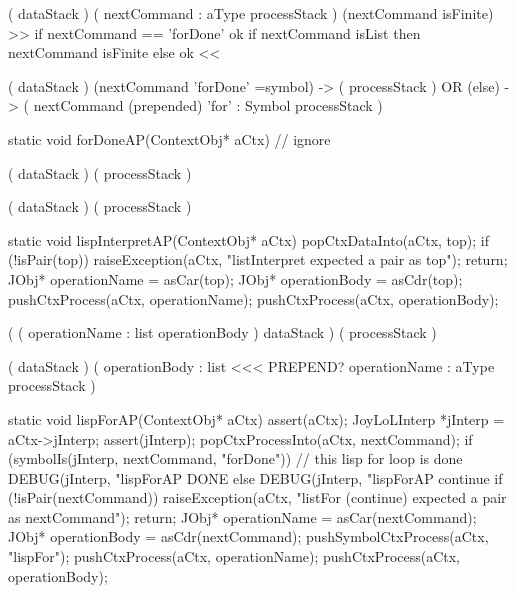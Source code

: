 \starttyping

\startWord[for]
\preDataStack
  (
    dataStack
  )
\preProcessStack
  (
    nextCommand : aType
    processStack
  )
\preConditions
  (nextCommand isFinite)  >> if nextCommand == 'forDone' ok
                             if nextCommand isList then nextCommand isFinite
                             else ok <<
\stopPreStack

\postDataStack
  (
    dataStack
  )
\postProcessStack
  (nextCommand 'forDone' =symbol) -> (
    processStack
  )
  OR
  (else) -> (
    nextCommand (prepended)
    'for' : Symbol
    processStack
  )
\postConditions
\stopPostStack

\stopWord

\stoptyping

\startCCode
static void forDoneAP(ContextObj* aCtx) {
  // ignore
}
\stopCCode

\starttyping

\startWord[forDone]

\preDataStack
  ( dataStack )
\preProcessStack
  ( processStack )
\preConditions
\stopPreStack

\postDataStack
  ( dataStack )
\postProcessStack
  ( processStack )
\postConditions
\stopPostStack

\stopWord

\stoptyping

\startCCode
static void lispInterpretAP(ContextObj* aCtx) {
  popCtxDataInto(aCtx, top);
  if (!isPair(top)) {
    raiseException(aCtx,
      "listInterpret expected a pair as top");
    return;
  }
  JObj* operationName = asCar(top);
  JObj* operationBody = asCdr(top);
  pushCtxProcess(aCtx, operationName);
  pushCtxProcess(aCtx, operationBody);
}
\stopCCode

\starttyping

\startWord[lispInterpret]

\preDataStack
  (
    (
      operationName : list
      operationBody
    )
    dataStack 
  )
\preProcessStack
  (
    processStack
  )
\preConditions
\stopPreStack

\postDataStack
  ( dataStack )
\postProcessStack
  (
    operationBody : list <<< PREPEND?
    operationName : aType
    processStack
  )
\postConditions
\stopPostStack

\stopWord

\stoptyping

\startCCode
static void lispForAP(ContextObj* aCtx) {
  assert(aCtx);
  JoyLoLInterp *jInterp = aCtx->jInterp;
  assert(jInterp);
  popCtxProcessInto(aCtx, nextCommand);
  if (symbolIs(jInterp, nextCommand, "forDone")) {
    // this lisp for loop is done
    DEBUG(jInterp, "lispForAP DONE%
  } else {
    DEBUG(jInterp, "lispForAP continue%
    if (!isPair(nextCommand)) {
      raiseException(aCtx,
        "listFor (continue) expected a pair as nextCommand");
      return;
    }
    JObj* operationName = asCar(nextCommand);
    JObj* operationBody = asCdr(nextCommand);
    pushSymbolCtxProcess(aCtx, "lispFor");
    pushCtxProcess(aCtx, operationName);
    pushCtxProcess(aCtx, operationBody);
  }
}
\stopCCode

